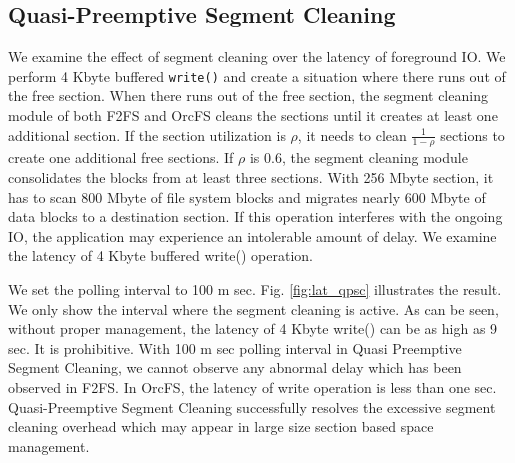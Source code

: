 \documentclass[prodmode,acmtecs]{acmsmall}
\begin{document}

\subsection{Quasi-Preemptive Segment Cleaning}
\label{subsec:qpsc_test}

We examine the effect of segment cleaning over the latency of
foreground IO. We perform 4 Kbyte buffered \texttt{write()} and create
a situation where there runs out of the free section.  When there runs out
of the free section, the segment cleaning module of both F2FS and OrcFS
cleans the sections until it creates at least one additional
section. If the section utilization is $\rho$, it needs to clean
$\frac{1}{1-\rho}$ sections to create one additional free sections.
If $\rho$ is 0.6, the segment cleaning module consolidates the blocks
from at least three sections. With 256 Mbyte section, it has to scan
800 Mbyte of file system blocks and migrates nearly 600 Mbyte of data
blocks to a destination section. If this operation interferes with the
ongoing IO, the application may experience an intolerable amount of
delay. We examine the latency of 4 Kbyte buffered write() operation.

We set the polling interval to 100 m sec.  Fig. \ref{fig:lat_qpsc}
illustrates the result.  We only show the interval where the segment
cleaning is active. As can be seen, without proper management, the
latency of 4 Kbyte write() can be as high as 9 sec. It is
prohibitive. With 100 m sec polling interval in Quasi Preemptive
Segment Cleaning, we cannot observe any abnormal delay which has been
observed in F2FS. In OrcFS, the latency of write operation is less
than one sec.  Quasi-Preemptive Segment Cleaning successfully resolves
the excessive segment cleaning overhead which may appear in large size
section based space management.
\end{document}
